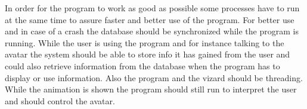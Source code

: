 
In order for the program to work as good as possible some processes have to run at the same time to assure faster and better use of the program. 
For better use and in case of a crash the database should be synchronized while the program is running. While the user is using the program and for instance talking to the avatar the system should be able to store info it has gained from the user and could also retrieve information from the database when the program has to display or use information.
Also the program and the vizard should be threading. While the animation is shown the program should still run to interpret the user and should control the avatar. 
